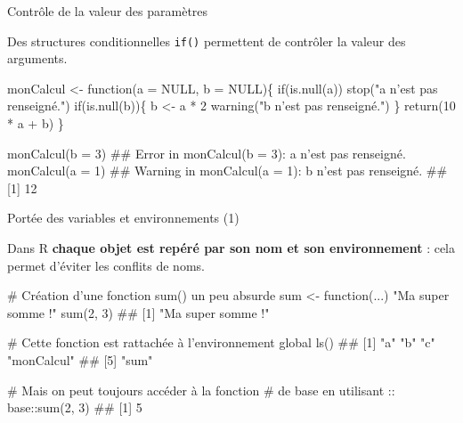 \documentclass[12pt,handout,ignorenonframetext,]{beamer}
\newenvironment{Shaded}{}{}
\newcommand{\KeywordTok}[1]{\textcolor[rgb]{0.00,0.00,1.00}{#1}}
\newcommand{\DataTypeTok}[1]{#1}
\newcommand{\DecValTok}[1]{#1}
\newcommand{\StringTok}[1]{\textcolor[rgb]{0.00,0.50,0.50}{#1}}
\newcommand{\CommentTok}[1]{\textcolor[rgb]{0.00,0.50,0.00}{#1}}
\newcommand{\OtherTok}[1]{\textcolor[rgb]{1.00,0.25,0.00}{#1}}
\newcommand{\ControlFlowTok}[1]{\textcolor[rgb]{0.00,0.00,1.00}{#1}}
\newcommand{\OperatorTok}[1]{#1}
\newcommand{\NormalTok}[1]{#1}
\renewenvironment{Shaded}{\begin{snugshade}}{\end{snugshade}}
\begin{document}
\begin{frame}[fragile]{Contrôle de la valeur des paramètres}

Des structures conditionnelles \texttt{if()} permettent de contrôler la
valeur des arguments.

\pause \footnotesize

\begin{Shaded}
\begin{Highlighting}[]
\NormalTok{monCalcul <-}\StringTok{ }\ControlFlowTok{function}\NormalTok{(}\DataTypeTok{a =} \OtherTok{NULL}\NormalTok{, }\DataTypeTok{b =} \OtherTok{NULL}\NormalTok{)\{}
  \ControlFlowTok{if}\NormalTok{(}\KeywordTok{is.null}\NormalTok{(a)) }\KeywordTok{stop}\NormalTok{(}\StringTok{"a n'est pas renseigné."}\NormalTok{)}
  \ControlFlowTok{if}\NormalTok{(}\KeywordTok{is.null}\NormalTok{(b))\{}
\NormalTok{    b <-}\StringTok{ }\NormalTok{a }\OperatorTok{*}\StringTok{ }\DecValTok{2}
    \KeywordTok{warning}\NormalTok{(}\StringTok{"b n'est pas renseigné."}\NormalTok{)}
\NormalTok{  \}}
  \KeywordTok{return}\NormalTok{(}\DecValTok{10} \OperatorTok{*}\StringTok{ }\NormalTok{a }\OperatorTok{+}\StringTok{ }\NormalTok{b)}
\NormalTok{\}}

\KeywordTok{monCalcul}\NormalTok{(}\DataTypeTok{b =} \DecValTok{3}\NormalTok{)}
\NormalTok{  ## Error in monCalcul(b = 3): a n'est pas renseigné.}
\KeywordTok{monCalcul}\NormalTok{(}\DataTypeTok{a =} \DecValTok{1}\NormalTok{)}
\NormalTok{  ## Warning in monCalcul(a = 1): b n'est pas renseigné.}
\NormalTok{  ## [1] 12}
\end{Highlighting}
\end{Shaded}

\end{frame}

\begin{frame}[fragile]{\large Portée des variables et environnements
(1)}

Dans R \textbf{chaque objet est repéré par son nom et son environnement}
: cela permet d'éviter les conflits de noms.

\pause \footnotesize

\begin{Shaded}
\begin{Highlighting}[]
\CommentTok{# Création d'une fonction sum() un peu absurde}
\NormalTok{sum <-}\StringTok{ }\ControlFlowTok{function}\NormalTok{(...) }\StringTok{"Ma super somme !"}
\KeywordTok{sum}\NormalTok{(}\DecValTok{2}\NormalTok{, }\DecValTok{3}\NormalTok{)}
\NormalTok{  ## [1] "Ma super somme !"}

\CommentTok{# Cette fonction est rattachée à l'environnement global}
\KeywordTok{ls}\NormalTok{()}
\NormalTok{  ## [1] "a"         "b"         "c"         "monCalcul"}
\NormalTok{  ## [5] "sum"}

\CommentTok{# Mais on peut toujours accéder à la fonction }
\CommentTok{# de base en utilisant ::}
\NormalTok{base}\OperatorTok{::}\KeywordTok{sum}\NormalTok{(}\DecValTok{2}\NormalTok{, }\DecValTok{3}\NormalTok{)}
\NormalTok{  ## [1] 5}
\end{Highlighting}
\end{Shaded}

\end{frame}
\end{document}
